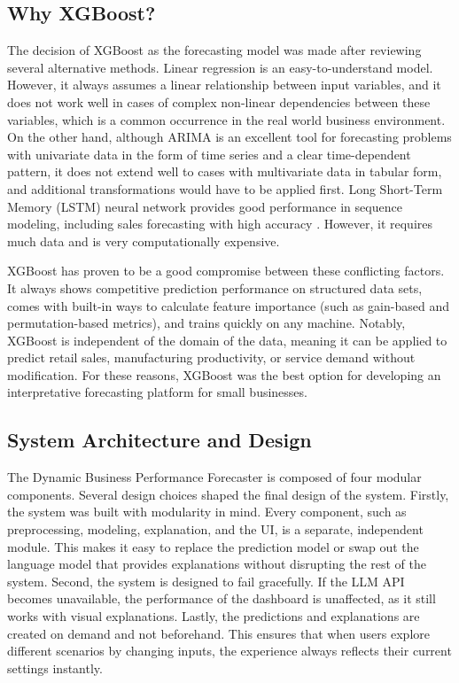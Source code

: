 \documentclass[12pt]{article}
\begin{document}
\subsection{Why XGBoost?}
The decision of XGBoost as the forecasting model was made after reviewing several alternative methods. Linear regression is an easy-to-understand model. However, it always assumes a linear relationship between input variables, and it does not work well in cases of complex non-linear dependencies between these variables, which is a common occurrence in the real world business environment. On the other hand, although ARIMA is an excellent tool for forecasting problems with univariate data in the form of time series and a clear time-dependent pattern, it does not extend well to cases with multivariate data in tabular form, and additional transformations would have to be applied first. Long Short-Term Memory (LSTM) neural network provides good performance in sequence modeling, including sales forecasting with high accuracy \cite{Qi2019ADN}. However, it requires much data and is very computationally expensive. 

XGBoost has proven to be a good compromise between these conflicting factors. It always shows competitive prediction performance on structured data sets, comes with built-in ways to calculate feature importance (such as gain-based and permutation-based metrics), and trains quickly on any machine. Notably, XGBoost is independent of the domain of the data, meaning it can be applied to predict retail sales, manufacturing productivity, or service demand without modification. For these reasons, XGBoost was the best option for developing an interpretative forecasting platform for small businesses.

\subsection{System Architecture and Design}
The Dynamic Business Performance Forecaster is composed of four modular components. Several design choices shaped the final design of the system. Firstly, the system was built with modularity in mind. Every component, such as preprocessing, modeling, explanation, and the UI, is a separate, independent module. This makes it easy to replace the prediction model or swap out the language model that provides explanations without disrupting the rest of the system. Second, the system is designed to fail gracefully. If the LLM API becomes unavailable, the performance of the dashboard is unaffected, as it still works with visual explanations. Lastly, the predictions and explanations are created on demand and not beforehand. This ensures that when users explore different scenarios by changing inputs, the experience always reflects their current settings instantly.
\end{document}
